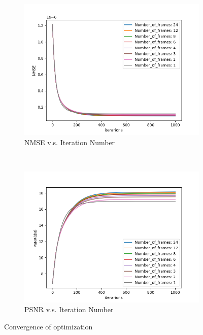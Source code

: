 	\begin{figure}[h!t]
		\begin{subfigure}[t]{0.5\textwidth}
			\centering
			\includegraphics[width=1.0\textwidth]{Mandrill_NMSE_vs_iter.png}
			\caption{NMSE v.s. Iteration Number}
			\label{fig:Mandrill_NMSE_vs_iter}
		\end{subfigure}
		~
		\begin{subfigure}[t]{0.5\textwidth}
			\centering
			\includegraphics[width=1.0\textwidth]{Mandrill_PSNR_vs_iter.png}
			\caption{PSNR v.s. Iteration Number}
			\label{fig:Mandrill_PSNR_vs_iter}
		\end{subfigure}
		\caption{Convergence of optimization}
		\label{fig:Convergence of optimization}
	\end{figure}
	
